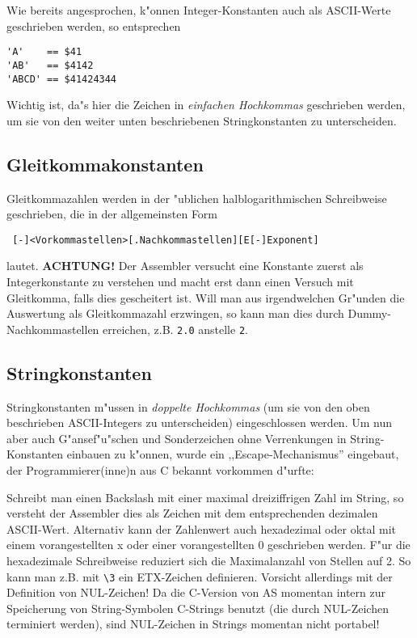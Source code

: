 \documentclass[12pt,a4paper,twoside]{report}
\newcommand{\bb}[1]{{\bf #1}}
\newcommand{\tty}[1]{{\tt #1}}
\begin{document}
Wie bereits angesprochen, k"onnen Integer-Konstanten auch als ASCII-Werte
geschrieben werden, so entsprechen
\begin{verbatim}
'A'    == $41
'AB'   == $4142
'ABCD' == $41424344
\end{verbatim}
Wichtig ist, da"s hier die Zeichen in {\em einfachen Hochkommas}
geschrieben werden, um sie von den weiter unten beschriebenen
Stringkonstanten zu unterscheiden.

\subsection{Gleitkommakonstanten}

Gleitkommazahlen werden in der "ublichen halblogarithmischen
Schreibweise geschrieben, die in der allgemeinsten Form
\begin{verbatim}
 [-]<Vorkommastellen>[.Nachkommastellen][E[-]Exponent]
\end{verbatim}
lautet. \bb{ACHTUNG!} Der Assembler versucht eine Konstante zuerst als
Integerkonstante zu verstehen und macht erst dann einen Versuch mit
Gleitkomma, falls dies gescheitert ist.  Will man aus irgendwelchen
Gr"unden die Auswertung als Gleitkommazahl erzwingen, so kann man
dies durch Dummy-Nachkommastellen erreichen, z.B. \tty{2.0} anstelle
\tty{2}.

\subsection{Stringkonstanten}
\label{SectStringConsts}

Stringkonstanten m"ussen in {\em doppelte Hochkommas} (um sie von den oben
beschrieben ASCII-Integers zu unterscheiden) eingeschlossen werden. Um nun
aber auch G"ansef"u"schen und Sonderzeichen ohne Verrenkungen in
String-Konstanten einbauen zu k"onnen, wurde ein ,,Escape-Mechanismus''
eingebaut, der Programmierer(inne)n aus C bekannt vorkommen d"urfte:

Schreibt man einen Backslash mit einer maximal dreiziffrigen Zahl im
String, so versteht der Assembler dies als Zeichen mit dem entsprechenden
dezimalen ASCII-Wert.  Alternativ kann der Zahlenwert auch hexadezimal
oder oktal mit einem vorangestellten x oder einer vorangestellten 0
geschrieben werden.  F"ur die hexadezimale Schreibweise reduziert sich die
Maximalanzahl von Stellen auf 2.  So kann man z.B. mit {\tt\verb!\3!} ein
ETX-Zeichen definieren.  Vorsicht allerdings mit der Definition von
NUL-Zeichen!  Da die C-Version  von AS momentan
intern zur Speicherung von String-Symbolen C-Strings benutzt (die durch
NUL-Zeichen terminiert werden), sind NUL-Zeichen in Strings momentan nicht
portabel!
\end{document}
